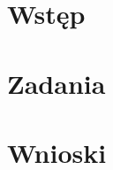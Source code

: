 \documentclass[a4paper,onecolumn,twoside,12pt]{mwrep}
\begin{document}
\raggedbottom 




\chapter{Wstęp} 

\chapter{Zadania} 

\chapter{Wnioski}  


\end{document}
